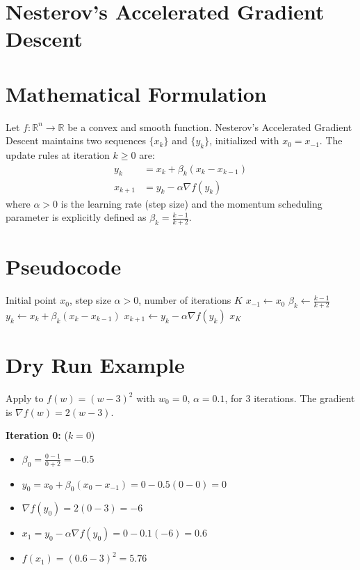 \documentclass{article}
\begin{document}
\section*{Nesterov's Accelerated Gradient Descent}
\section*{Mathematical Formulation}
Let $f: \mathbb{R}^n \to \mathbb{R}$ be a convex and smooth function. Nesterov's Accelerated Gradient Descent maintains two sequences $\{x_k\}$ and $\{y_k\}$, initialized with $x_0 = x_{-1}$. The update rules at iteration $k \geq 0$ are:
\begin{align*}
y_k &= x_k + \beta_k (x_k - x_{k-1}) \\
x_{k+1} &= y_k - \alpha \nabla f(y_k)
\end{align*}
where $\alpha > 0$ is the learning rate (step size) and the momentum scheduling parameter is explicitly defined as $\beta_k = \frac{k-1}{k+2}$.

\section*{Pseudocode}
\begin{algorithm}[H]
\caption{Nesterov's Accelerated Gradient Descent}
\begin{algorithmic}[1]
\REQUIRE Initial point $x_0$, step size $\alpha > 0$, number of iterations $K$
\STATE $x_{-1} \leftarrow x_0$
\STATE $\beta_k \leftarrow \frac{k-1}{k+2}$
\STATE $y_k \leftarrow x_k + \beta_k (x_k - x_{k-1})$
\STATE $x_{k+1} \leftarrow y_k - \alpha \nabla f(y_k)$
\ENDFOR
\ENSURE $x_K$
\end{algorithmic}
\end{algorithm}

\section*{Dry Run Example}
Apply to $f(w) = (w-3)^2$ with $w_0 = 0$, $\alpha = 0.1$, for 3 iterations. The gradient is $\nabla f(w) = 2(w-3)$.

\textbf{Iteration 0:} ($k=0$)
\begin{itemize}
\item $\beta_0 = \frac{0-1}{0+2} = -0.5$
\item $y_0 = x_0 + \beta_0(x_0 - x_{-1}) = 0 - 0.5(0 - 0) = 0$
\item $\nabla f(y_0) = 2(0 - 3) = -6$
\item $x_1 = y_0 - \alpha \nabla f(y_0) = 0 - 0.1(-6) = 0.6$
\item $f(x_1) = (0.6 - 3)^2 = 5.76$
\end{itemize}
\end{document}
